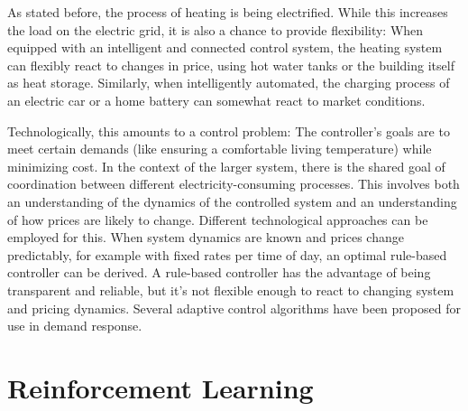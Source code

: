 As stated before, the process of heating is being electrified.
While this increases the load on the electric grid, it is also a chance to provide flexibility:
When equipped with an intelligent and connected control system, the heating system can flexibly react to changes in price, using hot water tanks or the building itself as heat storage.
Similarly, when intelligently automated, the charging process of an electric car or a home battery can somewhat react to market conditions.

Technologically, this amounts to a control problem:
The controller's goals are to meet certain demands (like ensuring a comfortable living temperature) while minimizing cost. In the context of the larger system, there is the shared goal of coordination between different electricity-consuming processes.
This involves both an understanding of the dynamics of the controlled system and an understanding of how prices are likely to change.
Different technological approaches can be employed for this.
When system dynamics are known and prices change predictably, for example with fixed rates per time of day, an optimal rule-based controller can be derived. 
A rule-based controller has the advantage of being transparent and reliable, but it's not flexible enough to react to changing system and pricing dynamics.
Several adaptive control algorithms have been proposed for use in demand response. 


\section{Reinforcement Learning}




